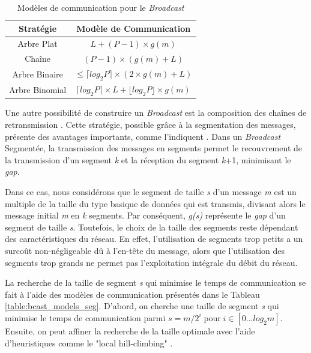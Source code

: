 %
\begin{table}
	\centering
	\begin{tabular}{|c|c|}
		\hline 
		\textbf{\small Stratégie} & \textbf{\small Modèle de Communication}\tabularnewline
		\hline
		\hline 
		{\small Arbre Plat} & {\small $L+(P-1)\times g(m)$}\tabularnewline
		\hline 
		{\small Chaîne} & {\small $(P-1)\times(g(m)+L)$}\tabularnewline
		\hline 
		{\small Arbre Binaire} & {\small $\leq\lceil log_{2}P\rceil\times(2\times g(m)+L)$}\tabularnewline
		\hline 
		{\small Arbre Binomial} & {\small $\lceil log_{2}P\rceil\times L+\lfloor log_{2}P\rfloor\times g(m)$}\tabularnewline
		\hline
	\end{tabular}
	
	
	\caption{\label{table:bcast_models_classique}Modèles de communication pour
		le \emph{Broadcast}}
	
\end{table}


Une autre possibilité de construire un \emph{Broadcast} est la composition
des chaînes de retransmission \cite{Barnett96}. Cette stratégie,
possible grâce à la segmentation des messages, présente des avantages
importants, comme l'indiquent \cite{Kielmann01}\cite{Thakur03}\cite{Beaumont04a}.
Dans un \emph{Broadcast} Segmentée, la transmission des messages en
segments permet le recouvrement de la transmission d'un segment \emph{k}
et la réception du segment \emph{k}+1, minimisant le \emph{gap}.

Dans ce cas, nous considérons que le segment de taille \emph{s} d'un
message \emph{m} est un multiple de la taille du type basique de données
qui est transmis, divisant alors le message initial \emph{m} en \emph{k}
segments. Par conséquent, \emph{g(s)} représente le \emph{gap} d'un
segment de taille \emph{s}. Toutefois, le choix de la taille des segments
reste dépendant des caractéristiques du réseau. En effet, l'utilisation
de segments trop petits a un surcoût non-négligeable dû à l'en-tête
du message, alors que l'utilisation des segments trop grands ne permet
pas l'exploitation intégrale du débit du réseau. 

La recherche de la taille de segment \emph{s} qui minimise le temps
de communication se fait à l'aide des modèles de communication présentés
dans le Tableau \ref{table:bcast_models_seg}. D'abord, on cherche
une taille de segment \emph{s} qui minimise le temps de communication
parmi $s=m/2^{i}\;\mathrm{pour}\; i\in[0\ldots log_{2}m]$. Ensuite,
on peut affiner la recherche de la taille optimale avec l'aide d'heuristiques
comme le "local hill-climbing" \cite{Kielmann01}.

